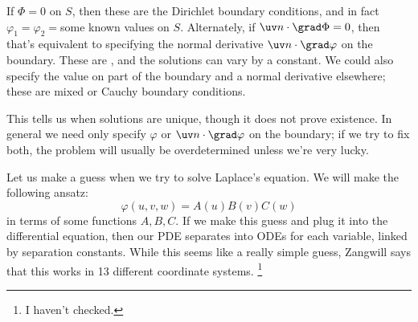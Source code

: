 If $\Phi=0$ on $S$, then these are the Dirichlet boundary conditions, and in fact $\varphi_1 = \varphi_2=$some known values on $S$. Alternately, if $\uv n \cdot \grad \Phi=0$, then that's equivalent to specifying the normal derivative $\uv n \cdot \grad \varphi$ on the boundary. These are , and the solutions can vary by a constant. We could also specify the value on part of the boundary and a normal derivative elsewhere; these are mixed or Cauchy boundary conditions.

This tells us when solutions are unique, though it does not prove existence. In general we need only specify $\varphi$ or $\uv n\cdot \grad \varphi$ on the boundary; if we try to fix both, the problem will usually be overdetermined unless we're very lucky.

Let us make a guess when we try to solve Laplace's equation. We will make the following ansatz:
\begin{equation}
    \varphi(u,v,w) = A(u) B(v) C(w)
\end{equation}
in terms of some functions $A,B,C$. If we make this guess and plug it into the differential equation, then our PDE separates into ODEs for each variable, linked by separation constants. While this seems like a really simple guess, Zangwill says that this works in 13 different coordinate systems.%
    \footnote{I haven't checked.}

